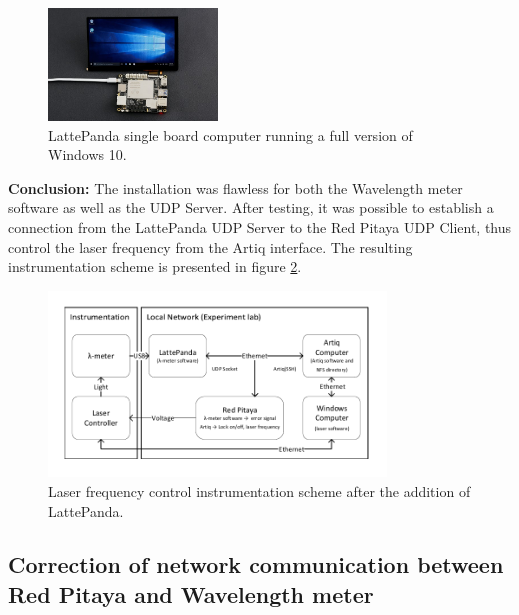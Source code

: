 \documentclass[a4paper,12pt]{article}
\begin{document}
\begin{figure}[!h]
    \centering
    \includegraphics[width=0.4\textwidth]{Images/LattePanda.jpg}
    \captionsetup{justification=centering}
    \caption{LattePanda single board computer running a full version of Windows 10.}
    \label{fig:latte_panda}
\end{figure}


\textbf{Conclusion:} The installation was flawless for both the Wavelength meter software as well as the UDP Server. After testing, it was possible to establish a connection from the LattePanda UDP Server to the Red Pitaya UDP Client, thus control the laser frequency from the Artiq interface. The resulting instrumentation scheme is presented in figure \ref{fig:schematic_3}.


\begin{figure}[!h]
    \centering
    \includegraphics[width=0.8\textwidth]{Images/schematic_final_stage.pdf}
    \captionsetup{justification=centering}
    \caption{Laser frequency control instrumentation scheme after the addition of LattePanda.}
    \label{fig:schematic_3}
\end{figure}

\newpage
\subsection{Correction of network communication between Red Pitaya and Wavelength meter}
\label{subsec:udp_correction}
\end{document}
